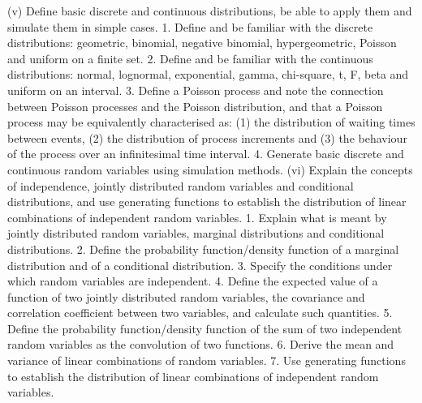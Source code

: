 (v) Define basic discrete and continuous distributions, be able to apply them and simulate them in simple cases.  
 1. Define and be familiar with the discrete distributions: geometric, binomial, negative binomial, hypergeometric, Poisson and uniform on a finite set. 
 2. Define and be familiar with the continuous distributions: normal, lognormal, exponential, gamma, chi-square, t, F, beta and uniform on an interval.  
 3. Define a Poisson process and note the connection between Poisson processes and the Poisson distribution, and that a Poisson process may be equivalently characterised as: (1) the distribution of waiting times between events, (2) the distribution of process increments and (3) the behaviour of the process over an infinitesimal time interval.  
 4. Generate basic discrete and continuous random variables using simulation methods.  
(vi) Explain the concepts of independence, jointly distributed random variables and conditional distributions, and use generating functions to establish the distribution of linear combinations of independent random variables.  
 1. Explain what is meant by jointly distributed random variables, marginal distributions and conditional distributions.  
 2. Define the probability function/density function of a marginal distribution and of a conditional distribution.  
 3. Specify the conditions under which random variables are independent.  
 4. Define the expected value of a function of two jointly distributed random variables, the covariance and correlation coefficient between two variables, and calculate such quantities.  
 5. Define the probability function/density function of the sum of two independent random variables as the convolution of two functions.  
 6. Derive the mean and variance of linear combinations of random variables.  
 7. Use generating functions to establish the distribution of linear combinations of independent random variables.  

